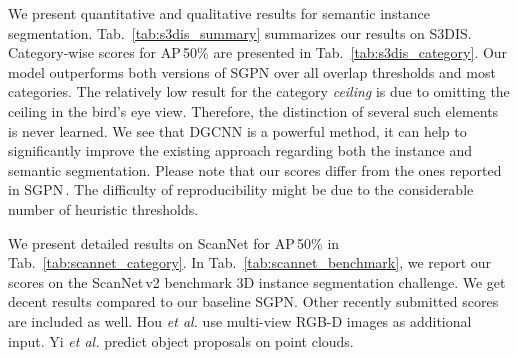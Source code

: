\documentclass[runningheads]{llncs}
\newcommand{\reftab}[1]{Tab.~\ref{tab:#1}}
\newcommand{\etal}{\textit{et al. }}
\begin{document}
{\begin{table}[t]
\begin{center}
\end{center}
\vspace{-5px}
\caption{\textbf{Category-wise AP\textsubscript{0.5} on S3DIS.} We receive the best results in nearly all categories.}
\label{tab:s3dis_category}
\end{table}

We present quantitative and qualitative results for semantic instance segmentation.
\reftab{s3dis_summary} summarizes our results on S3DIS. Category-wise scores for AP\,50\% are presented in \reftab{s3dis_category}.
Our model outperforms both versions of SGPN over all overlap thresholds and most categories. The relatively low result for the category \textit{ceiling} is due to omitting the ceiling in the bird's eye view. Therefore, the distinction of several such elements is never learned.
We see that DGCNN is a powerful method, it can help to significantly improve the existing approach regarding both the instance and semantic segmentation. 
Please note that our scores differ from the ones reported in SGPN\,\cite{Wang18CVPR}. The difficulty of reproducibility might be due to the considerable number of heuristic thresholds. 


We present detailed results on ScanNet for AP\,50\% in \reftab{scannet_category}. 
In \reftab{scannet_benchmark}, we report our scores on the ScanNet\,v2 benchmark 3D instance segmentation challenge. We get decent results compared to our baseline SGPN. Other recently submitted scores are included as well. Hou \etal \cite{Hou18CoRR} use multi-view RGB-D images as additional input. Yi \etal \cite{Yi18CoRR} predict object proposals on point clouds.
\newline

}
\end{document}
